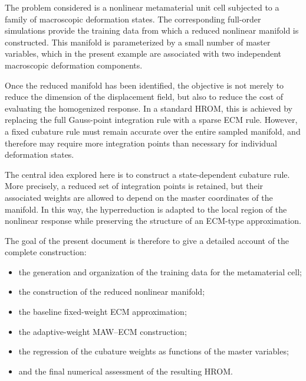 \documentclass[11pt,a4paper]{article}
\begin{document}
The problem considered is a nonlinear metamaterial unit cell subjected to a family of
macroscopic deformation states. The corresponding full-order simulations provide the
training data from which a reduced nonlinear manifold is constructed. This manifold is
parameterized by a small number of master variables, which in the present example are
associated with two independent macroscopic deformation components.

Once the reduced manifold has been identified, the objective is not merely to reduce the
dimension of the displacement field, but also to reduce the cost of evaluating the
homogenized response. In a standard HROM, this is achieved by replacing the full
Gauss-point integration rule with a sparse ECM rule. However, a fixed cubature rule must
remain accurate over the entire sampled manifold, and therefore may require more
integration points than necessary for individual deformation states.

The central idea explored here is to construct a state-dependent cubature rule. More
precisely, a reduced set of integration points is retained, but their associated weights
are allowed to depend on the master coordinates of the manifold. In this way, the
hyperreduction is adapted to the local region of the nonlinear response while preserving
the structure of an ECM-type approximation.

The goal of the present document is therefore to give a detailed account of the complete
construction:
\begin{itemize}[leftmargin=1.2cm]
    \item the generation and organization of the training data for the metamaterial cell;
    \item the construction of the reduced nonlinear manifold;
    \item the baseline fixed-weight ECM approximation;
    \item the adaptive-weight MAW--ECM construction;
    \item the regression of the cubature weights as functions of the master variables;
    \item and the final numerical assessment of the resulting HROM.
\end{itemize}

\end{document}
